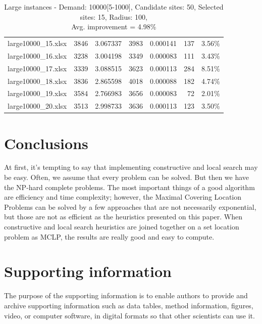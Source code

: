 \documentclass[11pt, a4paper]{article}
\begin{document}
\begin{table}[h!]
\begin{adjustbox}{max width=\textwidth}
\begin{tabular}{lrrrrrl}
		 large10000\_15.xlsx &   3846 &           3.067337 &    3983 &           0.000141 &           137 &        3.56\% \\
		 large10000\_16.xlsx &   3238 &           3.004198 &    3349 &           0.000083 &           111 &        3.43\% \\
		 large10000\_17.xlsx &   3339 &           3.088515 &    3623 &           0.000113 &           284 &        8.51\% \\
		 large10000\_18.xlsx &   3836 &           2.865598 &    4018 &           0.000088 &           182 &        4.74\% \\
		 large10000\_19.xlsx &   3584 &           2.766983 &    3656 &           0.000083 &            72 &        2.01\% \\
		 large10000\_20.xlsx &   3513 &           2.998733 &    3636 &           0.000113 &           123 &        3.50\% \\
		\bottomrule
		\end{tabular}		
\end{adjustbox}
\caption{Large instances - Demand: 10000[5-1000], Candidate sites: 50, Selected sites: 15, Radius: 100,\\ \centering Avg. improvement = 4.98\%}
\label{tab:large_instances}
\end{table}

\section{Conclusions}
At first, it's tempting to say that implementing constructive and local search may be easy. Often, we assume that every problem can be solved. But then we have the NP-hard complete problems. The most important things of a good algorithm are efficiency and time complexity; however, the Maximal Covering Location Problems can be solved by a few approaches that are not necessarily exponential, but those are not as efficient as the heuristics presented on this paper. When constructive and local search heuristics are joined together on a set location problem as MCLP, the results are really good and easy to compute.

\appendix
\section{Supporting information}
The purpose of the supporting information is to enable authors to provide and archive supporting information such as data tables, method information, figures, video, or computer software, in digital formats so that other scientists can use it.

\small \singlespacing
 

\end{document}
